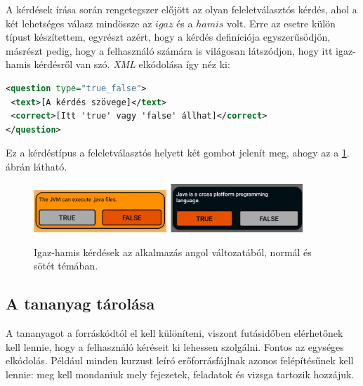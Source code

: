 \documentclass[12pt,a4paper]{article}
\newcommand{\xml}{\textit{XML}\xspace}
\begin{document}
	A kérdések írása során rengetegszer előjött az olyan feleletválasztós kérdés, ahol a két lehetséges válasz mindössze az $igaz$ és a $hamis$ volt. Erre az esetre külön típust készítettem, egyrészt azért, hogy a kérdés definíciója egyszerűsödjön, másrészt pedig, hogy a felhasználó számára is világosan látszódjon, hogy itt igaz-hamis kérdésről van szó. \xml elkódolása így néz ki:
	
	\begin{lstlisting}[language=XML]	
<question type="true_false">
 <text>[A kérdés szövege]</text>
 <correct>[Itt 'true' vagy 'false' állhat]</correct>
</question>
	\end{lstlisting}
	
	Ez a kérdéstípus a feleletválasztós helyett két gombot jelenít meg, ahogy az a \ref{question_true_false_figure}. ábrán látható.
	
	\begin{figure}[h!]
		\centering
		\includegraphics[width=5cm]{question_true_false}
		\includegraphics[width=5cm]{question_true_false_dark}
		\caption{Igaz-hamis kérdések az alkalmazás angol változatából, normál és sötét témában.}
		\label{question_true_false_figure}
	\end{figure}
	
	
	\subsection{A tananyag tárolása}\label{tananyag_tarolasa}
	
	A tananyagot a forráskódtól el kell különíteni, viszont futásidőben elérhetőnek kell lennie, hogy a felhasználó kéréseit ki lehessen szolgálni. Fontos az egységes elkódolás. Például minden kurzust leíró erőforrásfájlnak azonos felépítésűnek kell lennie: meg kell mondaniuk mely fejezetek, feladatok és vizsga tartozik hozzájuk.
	
\end{document}
